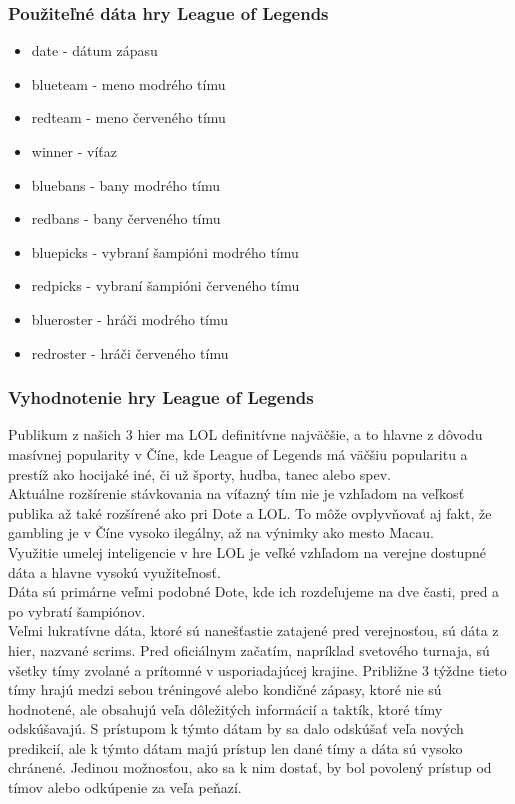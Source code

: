 \subsubsection{Použiteľné dáta hry League of Legends}
\begin{itemize}
\item date - dátum zápasu 
\item blueteam - meno modrého tímu 
\item redteam - meno červeného tímu 
\item winner - víťaz 
\item bluebans - bany modrého tímu 
\item redbans - bany červeného tímu 
\item bluepicks - vybraní šampióni modrého tímu 
\item redpicks - vybraní šampióni červeného tímu 
\item blueroster - hráči modrého tímu 
\item redroster - hráči červeného tímu 
\end{itemize}
\subsubsection{Vyhodnotenie hry League of Legends}

Publikum z našich 3 hier ma LOL definitívne najväčšie, a to hlavne z dôvodu masívnej popularity v Číne, kde League of Legends má väčšiu popularitu a prestíž ako hocijaké iné, či už športy, hudba, tanec alebo spev. \cite{chinalol} 
\\
Aktuálne rozšírenie stávkovania na víťazný tím nie je vzhľadom na veľkosť publika až také rozšírené ako pri Dote a LOL. To môže ovplyvňovať aj fakt, že gambling je v Číne vysoko ilegálny, až na výnimky ako mesto Macau.\cite{chinagambling}
\\
Využitie  umelej inteligencie v hre LOL je veľké vzhľadom na verejne dostupné dáta a hlavne vysokú využiteľnosť.
\\
Dáta sú primárne veľmi podobné Dote, kde ich rozdeľujeme na dve časti, pred a po vybratí šampiónov.
\\
Veľmi lukratívne dáta, ktoré sú nanešťastie zatajené pred verejnosťou, sú dáta z hier, nazvané scrims. Pred oficiálnym začatím, napríklad svetového turnaja, sú všetky tímy zvolané a prítomné v usporiadajúcej krajine. Približne 3 týždne tieto tímy hrajú medzi sebou tréningové alebo kondičné zápasy, ktoré nie sú hodnotené, ale obsahujú veľa dôležitých informácií a taktík, ktoré tímy odskúšavajú. S prístupom k týmto dátam by sa dalo odskúšať veľa nových predikcií, ale k týmto dátam majú prístup len dané tímy a dáta sú vysoko chránené. Jedinou možnosťou, ako sa k nim dostať, by bol povolený prístup od tímov alebo odkúpenie za veľa peňazí.
\\


